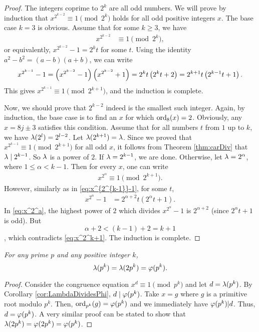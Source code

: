 \documentclass{subfile}
\begin{document}
	\begin{proof}
		The integers coprime to $2^k$ are all odd numbers. We will prove by induction that $x^{2^{k-2}} \equiv1\pmod{2^k}$ holds for all odd positive integers $x$. The base case $k=3$ is obvious. Assume that for some $k\geq 3$, we have
			\begin{align*}
				x^{2^{k-2}} & \equiv1\pmod{2^k},
			\end{align*}
		or equivalently, $x^{2^{k-2}} -1=2^kt$ for some $t$. Using the identity $a^2-b^2=(a-b)(a+b)$, we can write
			\begin{align}
				x^{2^{k-1}} -1 = \left(x^{2^{k-2}} -1\right)\left(x^{2^{k-2}} +1\right) = 2^kt\left(2^kt +2\right) = 2^{k+1}t \left(2^{k-1}t+1\right). \label{eq:x^{2^{k-1}}-1}
			\end{align}
		This gives $x^{2^{k-1}} \equiv 1\pmod{2^{k+1}}$, and the induction is complete.
		
		Now, we should prove that $2^{k-2}$ indeed is the smallest such integer. Again, by induction, the base case is to find an $x$ for which $\operatorname{ord}_8(x)=2$. Obviously, any $x=8j\pm3$ satisfies this condition. Assume that for all numbers $t$ from $1$ up to $k$, we have $\lambda(2^l)=2^{l-2}$. Let $\lambda(2^{k+1})=\lambda$. Since we proved that $x^{2^{k-1}} \equiv 1\pmod{2^{k+1}}$ for all odd $x$, it follows from Theorem \ref{thm:carDiv} that $\lambda \mid 2^{k-1}$. So $\lambda$ is a power of $2$. If $\lambda = 2^{k-1}$, we are done. Otherwise, let $\lambda=2^\alpha$, where $1 \leq \alpha <k-1$. Then for every $x$, one can write
			\begin{align}\label{eq:x^2^k+1}
				x^{2^\alpha} \equiv 1 \pmod{2^{k+1}}.
			\end{align}
		However, similarly as in \eqref{eq:x^{2^{k-1}}-1}, for some $t$,
			\begin{align}\label{eq:x^2^a}
				x^{2^{\alpha}} -1 &= 2^{\alpha+2}t \left(2^{\alpha}t+1\right).
			\end{align}
		In \eqref{eq:x^2^a}, the highest power of $2$ which divides $x^{2^{\alpha}} -1$ is $2^{\alpha+2}$ (since $2^{\alpha}t+1$ is odd). But $$\alpha+2 <(k-1)+2=k+1$$, which contradicts \eqref{eq:x^2^k+1}. The induction is complete.
	\end{proof}
	
	\begin{theorem}\slshape
		For any prime $p$ and any positive integer $k$, 
		\[\lambda(p^k)=\lambda(2p^k)=\varphi(p^k).\]
	\end{theorem}
	
	\begin{proof}
		Consider the congruence equation $x^d\equiv1\pmod{p^k}$ and let $d=\lambda(p^k)$. By Corollary \ref{cor:LambdaDividesPhi}, $d \mid \varphi(p^k)$. Take $x=g$ where $g$ is a primitive root modulo $p^k$. Then, $\operatorname{ord}_{p^k}(g)=\varphi(p^k)$ and we immediately have $\varphi(p^k)|d$. Thus, $d=\varphi(p^k)$. A very similar proof can be stated to show that $\lambda (2p^k)=\varphi (2p^k) = \varphi (p^k)$.
	\end{proof}
	
\end{document}
